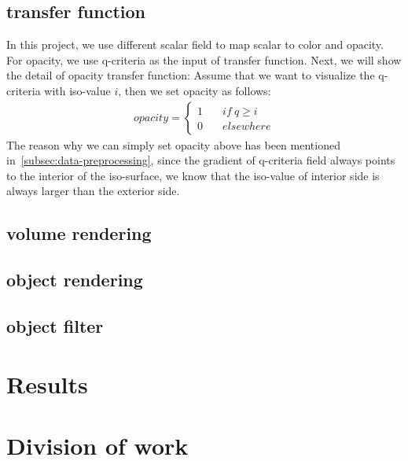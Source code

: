 \documentclass[acmtog]{acmart}
\begin{document}
    \subsection{transfer function}\label{subsec:transfer-function}
    In this project, we use different scalar field to map scalar to color and opacity.
    For opacity, we use q-criteria as the input of transfer function.
    Next, we will show the detail of opacity transfer function:
    Assume that we want to visualize the q-criteria with iso-value $i$, then we set opacity as follows:
    \begin{align*}
        opacity = \left\{
        \begin{aligned}
            1&\quad if\ q \geq i\\
            0&\quad elsewhere
        \end{aligned}
        \right.
    \end{align*}
    The reason why we can simply set opacity above has been mentioned in~\ref{subsec:data-preprocessing}, since the gradient of q-criteria field always points to the interior of the iso-surface, we know that the iso-value of interior side is always larger than the exterior side.

    \subsection{volume rendering}\label{subsec:volume-rendering}

    \subsection{object rendering}\label{subsec:object-rendering}

    \subsection{object filter}\label{subsec:object-filter}


    \section{Results}\label{sec:results}


    \section{Division of work}\label{sec:division-of-work}
\end{document}
